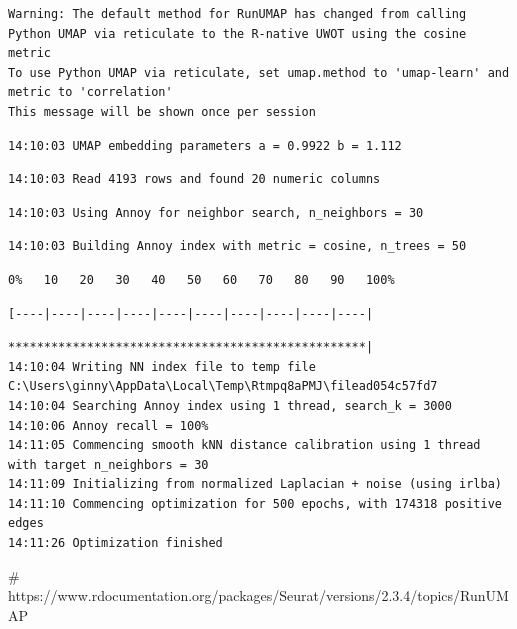 \documentclass[
  letterpaper,
  DIV=11,
  numbers=noendperiod]{scrartcl}
\newenvironment{Shaded}{\begin{snugshade}}{\end{snugshade}}
\newcommand{\CommentTok}[1]{\textcolor[rgb]{0.37,0.37,0.37}{#1}}
\begin{document}
\begin{verbatim}
Warning: The default method for RunUMAP has changed from calling Python UMAP via reticulate to the R-native UWOT using the cosine metric
To use Python UMAP via reticulate, set umap.method to 'umap-learn' and metric to 'correlation'
This message will be shown once per session
\end{verbatim}

\begin{verbatim}
14:10:03 UMAP embedding parameters a = 0.9922 b = 1.112
\end{verbatim}

\begin{verbatim}
14:10:03 Read 4193 rows and found 20 numeric columns
\end{verbatim}

\begin{verbatim}
14:10:03 Using Annoy for neighbor search, n_neighbors = 30
\end{verbatim}

\begin{verbatim}
14:10:03 Building Annoy index with metric = cosine, n_trees = 50
\end{verbatim}

\begin{verbatim}
0%   10   20   30   40   50   60   70   80   90   100%
\end{verbatim}

\begin{verbatim}
[----|----|----|----|----|----|----|----|----|----|
\end{verbatim}

\begin{verbatim}
**************************************************|
14:10:04 Writing NN index file to temp file C:\Users\ginny\AppData\Local\Temp\Rtmpq8aPMJ\filead054c57fd7
14:10:04 Searching Annoy index using 1 thread, search_k = 3000
14:10:06 Annoy recall = 100%
14:11:05 Commencing smooth kNN distance calibration using 1 thread with target n_neighbors = 30
14:11:09 Initializing from normalized Laplacian + noise (using irlba)
14:11:10 Commencing optimization for 500 epochs, with 174318 positive edges
14:11:26 Optimization finished
\end{verbatim}

\begin{Shaded}
\begin{Highlighting}[]
\CommentTok{\# https://www.rdocumentation.org/packages/Seurat/versions/2.3.4/topics/RunUMAP}
\end{Highlighting}
\end{Shaded}
\end{document}
